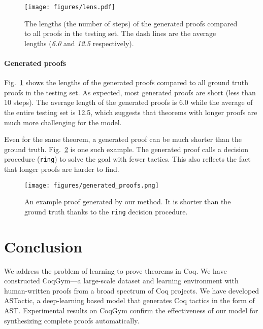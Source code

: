 \documentclass{article}
\newcommand{\smallsec}[1]{\vspace{-3mm} \paragraph{#1}}
\newcommand{\datasetname}{CoqGym}
\begin{document}
\begin{figure}[ht]
\vskip 0.2in
\begin{center}
\vspace{-7mm}
\centerline{\texttt{[image: figures/lens.pdf]}}
\vspace{-3mm}
\caption{The lengths (the number of steps) of the generated proofs compared to all proofs in the testing set. The dash lines are the average lengths (\textit{6.0} and \textit{12.5} respectively).}
\label{fig:length}
\end{center}
\vskip -0.3in
\end{figure}


\smallsec{Generated proofs} Fig.~\ref{fig:length} shows the lengths of the generated proofs compared to all ground truth proofs in the testing set.
As expected, most generated proofs are short (less than 10 steps).
The average length of the generated proofs is 6.0 while the average of the entire testing set is 12.5, which suggests that theorems with longer proofs are much more challenging for the model. 


Even for the same theorem, a generated proof can be much shorter than the ground truth. Fig.~\ref{fig:generated_proofs} is one such example. The generated proof calls a decision procedure (\texttt{ring}) to solve the goal with fewer tactics.
This also reflects the fact that longer proofs are harder to find.


\begin{figure}[h]
\vskip 0.2in
\begin{center}
\vspace{-7mm}
\centerline{\texttt{[image: figures/generated\_proofs.png]}}
\vspace{-2mm}
\caption{An example proof generated by our method. It is shorter than the ground truth thanks to the \texttt{ring} decision procedure.}
\label{fig:generated_proofs}
\end{center}
\vskip -0.3in
\end{figure}



\section{Conclusion}

We address the problem of learning to prove theorems in Coq. We have constructed \datasetname---a large-scale dataset and learning environment with human-written proofs from a broad spectrum of Coq projects.
We have developed ASTactic, a deep-learning based model that generates Coq tactics in the form of AST.
Experimental results on {\datasetname } confirm the effectiveness of our model for synthesizing complete proofs automatically.
\end{document}
